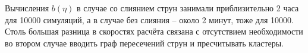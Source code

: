 Вычисления $b(\eta)$ в случае со слиянием струн занимали приблизительно 2 часа для 10000 симуляций, а в случае без слияния -- около 2 минут, тоже для 10000. Столь большая разница в скоростях расчёта связана с отсутствием необходимости во втором случае вводить граф пересечений струн и пресчитывать кластеры.
